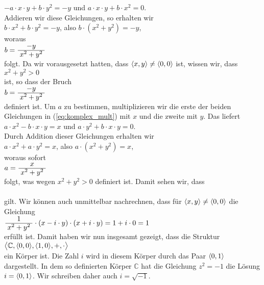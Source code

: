 $-a \cdot x \cdot y + b \cdot y^2 = -y$ \quad und \quad $a \cdot x \cdot y + b \cdot
x^2 = 0$.
\\[0.2cm]
Addieren wir diese Gleichungen, so erhalten wir
\\[0.2cm]
\hspace*{1.3cm} 
$b \cdot x^2 + b \cdot y^2 = -y$, \quad also \quad
$b \cdot (x^2 + y^2) = -y$,
\\[0.2cm]
woraus
\\[0.2cm]
\hspace*{1.3cm}
$b = \bruch{-y}{x^2 + y^2}$
\\[0.2cm]
folgt.  Da wir vorausgesetzt hatten, dass $\pair(x, y) \not= \pair(0, 0)$ ist, wissen wir, dass 
\\[0.2cm]
\hspace*{1.3cm}
$x^2 + y^2 > 0$
\\[0.2cm]
ist, so dass der Bruch 
\\[0.2cm]
\hspace*{1.3cm}
$b = \bruch{-y}{x^2 + y^2}$
\\[0.2cm]
definiert ist.  Um $a$ zu bestimmen, multiplizieren wir die erste der beiden Gleichungen in
(\ref{eq:komplex_mult}) mit $x$ und die zweite mit $y$.  Das liefert
\\[0.2cm]
\hspace*{1.3cm}
$a \cdot x^2 - b \cdot x \cdot y = x$ \quad und \quad $a \cdot y^2 + b \cdot x \cdot y = 0$.
\\[0.2cm]
Durch Addition dieser Gleichungen erhalten wir
\\[0.2cm]
\hspace*{1.3cm}
$a \cdot x^2 + a \cdot y^2 = x$, \quad also \quad $a \cdot (x^2 + y^2) = x$,
\\[0.2cm]
woraus sofort
\\[0.2cm]
\hspace*{1.3cm}
$a = \bruch{x}{x^2 + y^2}$
\\[0.2cm]
folgt, was wegen $x^2 + y^2 > 0$ definiert ist.  Damit sehen wir, dass 
\\[0.2cm]
\hspace*{1.3cm}
\colorbox{red}{}
\\[0.2cm]
gilt.  Wir k\"{o}nnen auch unmittelbar nachrechnen, dass f\"{u}r $\pair(x,y) \not= \pair(0,0)$ die Gleichung
\\[0.2cm]
\hspace*{1.3cm}
$\bruch{1}{x^2 + y^2} \cdot (x  - i \cdot y) \cdot (x + i \cdot y) = 1 + i \cdot 0 = 1$ 
\\[0.2cm]
erf\"{u}llt ist.  Damit haben wir nun insgesamt gezeigt, dass die Struktur
\\[0.2cm]
\hspace*{1.3cm}
$\bigl\langle \mathbb{C}, \pair(0,0), \pair(1,0), +, \cdot \bigr\rangle$ 
\\[0.2cm]
ein K\"{o}rper ist.  Die Zahl $i$ wird in diesem K\"{o}rper durch das Paar $\pair(0,1)$ dargestellt.
In dem so definierten K\"{o}rper $\mathbb{C}$ hat die Gleichung $z^2 = -1$ die L\"{o}sung
$i = \pair(0,1)$.  Wir schreiben daher auch $i = \sqrt{-1}$.

